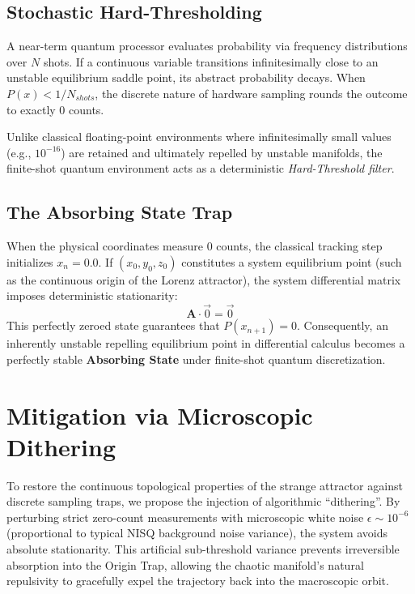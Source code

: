 \documentclass[11pt,a4paper]{article}
\begin{document}
\subsection{Stochastic Hard-Thresholding}
A near-term quantum processor evaluates probability via frequency distributions over $N$ shots. If a continuous variable transitions infinitesimally close to an unstable equilibrium saddle point, its abstract probability decays. When $P(x) < 1/N_{shots}$, the discrete nature of hardware sampling rounds the outcome to exactly $0$ counts. 

Unlike classical floating-point environments where infinitesimally small values (e.g., $10^{-16}$) are retained and ultimately repelled by unstable manifolds, the finite-shot quantum environment acts as a deterministic \textit{Hard-Threshold filter}. 

\subsection{The Absorbing State Trap}
When the physical coordinates measure $0$ counts, the classical tracking step initializes $x_n = 0.0$. If $(x_0, y_0, z_0)$ constitutes a system equilibrium point (such as the continuous origin of the Lorenz attractor), the system differential matrix imposes deterministic stationarity: 
$$ \mathbf{A} \cdot \vec{0} = \vec{0} $$
This perfectly zeroed state guarantees that $P(x_{n+1}) = 0$. Consequently, an inherently unstable repelling equilibrium point in differential calculus becomes a perfectly stable \textbf{Absorbing State} under finite-shot quantum discretization. 

\section{Mitigation via Microscopic Dithering}
To restore the continuous topological properties of the strange attractor against discrete sampling traps, we propose the injection of algorithmic ``dithering''. By perturbing strict zero-count measurements with microscopic white noise $\epsilon \sim 10^{-6}$ (proportional to typical NISQ background noise variance), the system avoids absolute stationarity. This artificial sub-threshold variance prevents irreversible absorption into the Origin Trap, allowing the chaotic manifold's natural repulsivity to gracefully expel the trajectory back into the macroscopic orbit.
\end{document}
